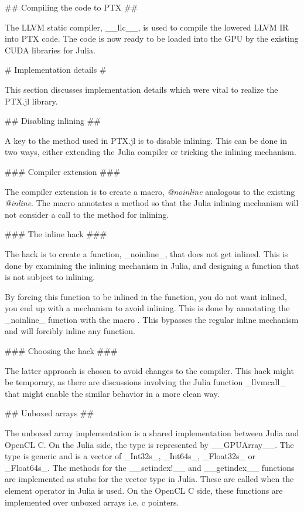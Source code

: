 \begin{markdown}
## Compiling the code to PTX ##

The LLVM static compiler, __llc__, is used to compile the lowered LLVM
IR into PTX code. The code is now ready to be loaded into the GPU by
the existing CUDA libraries for Julia.

# Implementation details #
\label{sec:implementation-details}

This section discusses implementation details which were vital
to realize the PTX.jl library.

## Disabling inlining ##

A key to the method used in PTX.jl is to disable inlining. This can be
done in two ways, either extending the Julia compiler or tricking the
inlining mechanism.

### Compiler extension ###

The compiler extension is to create a macro, \textit{@noinline} analogous to
the existing \textit{@inline}. The macro annotates a method so that the Julia
inlining mechanism will not consider a call to the method for
inlining.

### The inline hack ###

The hack is to create a function, _noinline_, that does not get
inlined. This is done by examining the inlining mechanism in Julia, and
designing a function that is not subject to inlining.

By forcing this function to be inlined in the function, you do not want
inlined, you end up with a mechanism to avoid inlining. This is done
by annotating the _noinline_ function with the macro . This
bypasses the regular inline mechanism and will forcibly inline any
function.

### Choosing the hack ###

The latter approach is chosen to avoid changes to the compiler. This
hack might be temporary, as there are discussions involving the Julia
function _llvmcall_ that might enable the similar behavior in a more
clean way.

## Unboxed arrays ##
\label{sec:implementation-details-unboxed}

The unboxed array implementation is a shared implementation between
Julia and OpenCL C. On the Julia side, the type is represented by
__GPUArray__. The type is generic and is a vector of _Int32s_,
_Int64s_, _Float32s_ or _Float64s_. The methods for the __setindex!__
and __getindex__ functions are implemented as stubs for the vector
type in Julia. These are called when the element operator in Julia is
used. On the OpenCL C side, these functions are implemented over
unboxed arrays i.e. c pointers. 


\end{markdown}
